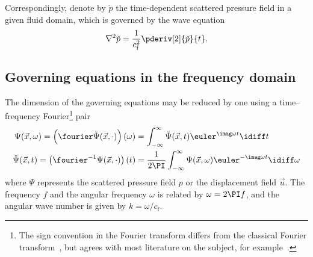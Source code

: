 Correspondingly, denote by $\breve{p}$ the time-dependent scattered pressure field in a given fluid domain, which is governed by the wave equation
\begin{equation}\label{Eq1:waveEquation}
	\nabla^2 \breve{p} = \frac{1}{c_{\mathrm{f}}^2} \pderiv[2]{\breve{p}}{t}.
\end{equation}

\subsection{Governing equations in the frequency domain}
The dimension of the governing equations may be reduced by one using a time--frequency Fourier\footnote{The sign convention in the Fourier transform differs from the classical Fourier transform~\cite{ISO2009qau}, but agrees with most literature on the subject, for example~\cite{Fender1972sfa,Ihlenburg1998fea,Jensen2011coa,Goodman1962rat}.} pair~\cite[p. 71]{Jensen2011coa}\begin{align}
	\Psi(\vec{x},\omega) = \left(\fourier\breve{\Psi}(\vec{x},\cdot)\right)(\omega) &= \int_{-\infty}^\infty \breve{\Psi}(\vec{x},t)\euler^{\imag \omega t}\idiff t\label{Eq1:Psi}\\
	\breve{\Psi}(\vec{x},t) = \left(\fourier^{-1}\Psi(\vec{x},\cdot)\right)(t)  &= \frac{1}{2\PI}\int_{-\infty}^\infty \Psi(\vec{x},\omega)\euler^{-\imag \omega t}\idiff \omega\label{Eq1:Psit}
\end{align}
where $\Psi$ represents the scattered pressure field $p$ or the displacement field $\vec{u}$. The frequency $f$ and the angular frequency $\omega$ is related by $\omega = 2\PI f$, and the angular wave number is given by $k=\omega/c_{\mathrm{f}}$.


